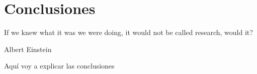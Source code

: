 \chapter{Conclusiones}\label{chp-04}

\epigraph{If we knew what it was we were doing, it would not be called research, would it?}{Albert Einstein}

Aquí voy a explicar las conclusiones